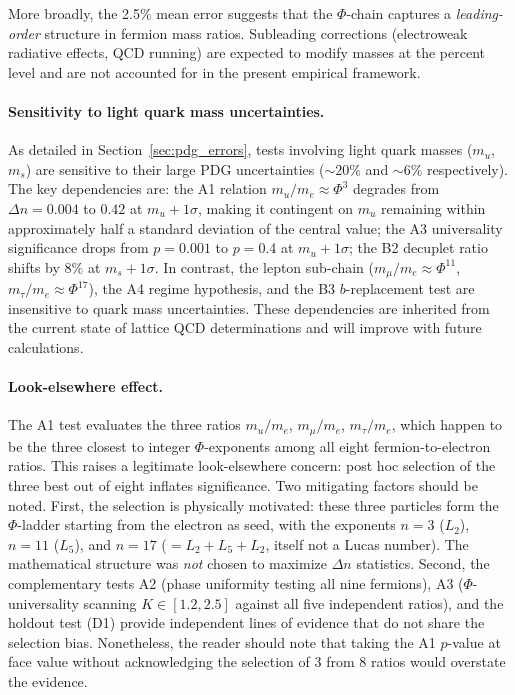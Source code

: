 \documentclass[11pt,a4paper]{article}
\begin{document}
More broadly, the 2.5\% mean error suggests that the $\Phi$-chain
captures a \emph{leading-order} structure in fermion mass ratios.
Subleading corrections (electroweak radiative effects, QCD running)
are expected to modify masses at the percent level and are not
accounted for in the present empirical framework.

\paragraph{Sensitivity to light quark mass uncertainties.}
As detailed in Section~\ref{sec:pdg_errors}, tests involving
light quark masses ($m_u$, $m_s$) are sensitive to their large PDG
uncertainties ($\sim 20\%$ and $\sim 6\%$ respectively).
The key dependencies are:
the A1 relation $m_u/m_e \approx \Phi^3$ degrades from
$\Delta n = 0.004$ to $0.42$ at $m_u + 1\sigma$, making it contingent
on $m_u$ remaining within approximately half a standard deviation of
the central value;
the A3 universality significance drops from $p = 0.001$ to $p = 0.4$
at $m_u + 1\sigma$;
the B2 decuplet ratio shifts by $8\%$ at $m_s + 1\sigma$.
In contrast, the lepton sub-chain ($m_\mu/m_e \approx \Phi^{11}$,
$m_\tau/m_e \approx \Phi^{17}$), the A4 regime hypothesis, and the B3
$b$-replacement test are insensitive to quark mass uncertainties.
These dependencies are inherited from the current state of lattice QCD
determinations and will improve with future calculations.

\paragraph{Look-elsewhere effect.}
The A1 test evaluates the three ratios $m_u/m_e$, $m_\mu/m_e$,
$m_\tau/m_e$, which happen to be the three closest to integer
$\Phi$-exponents among all eight fermion-to-electron ratios. This
raises a legitimate look-elsewhere concern: post hoc selection of
the three best out of eight inflates significance.
Two mitigating factors should be noted.
First, the selection is physically motivated: these three particles
form the $\Phi$-ladder starting from the electron as seed, with the
exponents $n = 3$ ($L_2$), $n = 11$ ($L_5$), and $n = 17$
($= L_2 + L_5 + L_2$, itself not a Lucas number). The mathematical
structure was \emph{not} chosen to maximize $\Delta n$ statistics.
Second, the complementary tests A2 (phase uniformity testing all nine
fermions), A3 ($\Phi$-universality scanning $K \in [1.2, 2.5]$ against
all five independent ratios), and the holdout test (D1)
provide independent lines of evidence that do not share the selection
bias.
Nonetheless, the reader should note that taking the A1 $p$-value
at face value without acknowledging the selection of 3 from 8
ratios would overstate the evidence.
\end{document}
